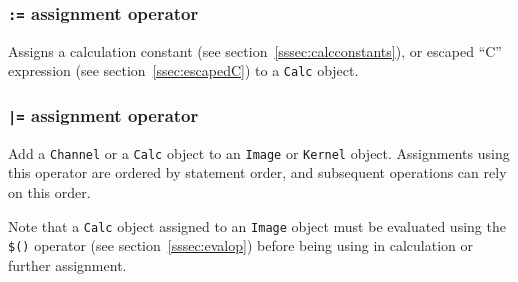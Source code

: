 \subsubsection{\texttt{:=} assignment operator}
\label{sssec:colonequalop}
Assigns a calculation constant (see section~\ref{sssec:calcconstants}), or
escaped ``C'' expression (see section~\ref{ssec:escapedC}) to a \texttt{Calc}
object.

\subsubsection{\texttt{|=} assignment operator}
\label{sssec:barequalop}
Add a \texttt{Channel} or a \texttt{Calc} object to an \texttt{Image} or
\texttt{Kernel} object. Assignments using this operator are ordered by statement
order, and subsequent operations can rely on this order.

Note that a \texttt{Calc} object assigned to an \texttt{Image} object must be
evaluated using the \texttt{\$()} operator (see section~\ref{sssec:evalop}) before
being using in calculation or further assignment.


